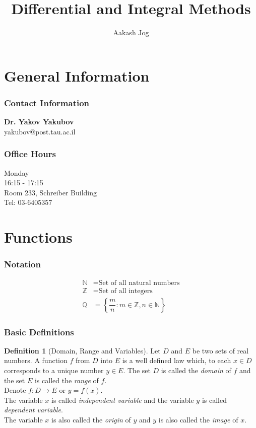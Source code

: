 \documentclass[fleqn]{article}
\title{Differential and Integral Methods}
\author{Aakash Jog}
\theoremstyle{definition}
\newtheorem{definition}{Definition}
\theoremstyle{theorem}
\theoremstyle{remark}
\begin{document}
	
\maketitle

\tableofcontents

\newpage

\part{General Information}

\section{Contact Information}
\textbf{Dr. Yakov Yakubov} \\
yakubov@post.tau.ac.il

\section{Office Hours}

Monday\\
16:15 - 17:15\\
Room 233, Schreiber Building\\
Tel: 03-6405357\\

\newpage
\part{Functions}

\section{Notation}

\begin{align*}
	\mathbb{N} &= \text{Set of all natural numbers}\\
	\mathbb{Z} &= \text{Set of all integers}\\
	\mathbb{Q} &= \left\lbrace \dfrac{m}{n} : m \in \mathbb{Z}, n \in \mathbb{N}\right\rbrace 
\end{align*}

\section{Basic Definitions}

\begin{definition}[Domain, Range and Variables]
	Let $D$ and $E$ be two sets of real numbers. A function $f$ from $D$ into $E$ is a well defined law which, to each $x \in D$ corresponds to a unique number $y \in E$. The set $D$ is called the \emph{domain} of $f$ and the set $E$ is called the \emph{range} of $f$. \\
	Denote $f : D \rightarrow E$ or $y = f(x)$. \\
	The variable $x$ is called \emph{independent variable} and the variable $y$ is called \emph{dependent variable}. \\
	The variable $x$ is also called the \emph{origin} of $y$ and $y$ is also called the \emph{image} of $x$. \\
\end{definition}
\end{document}
